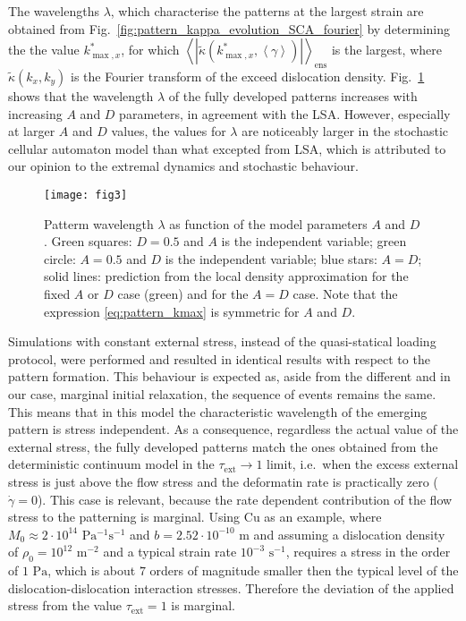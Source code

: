 The wavelengths $\lambda$, which characterise the patterns at the largest strain are obtained from Fig.~\ref{fig:pattern_kappa_evolution_SCA_fourier} by determining the the value ${k_{\max ,x}^ * }$, for which ${\left\langle {\left| {\tilde \kappa \left( {k_{\max ,x}^ * ,\left\langle \gamma  \right\rangle } \right)} \right|} \right\rangle _{{\text{ens}}}}$ is the largest, where $\tilde \kappa \left( {{k_x},{k_y}} \right)$ is the Fourier transform of the exceed dislocation density.
Fig.~\ref{fig:pattern_wavelength_plot} shows that the wavelength $\lambda$ of the fully developed patterns increases with increasing $A$ and $D$ parameters, in agreement with the LSA. However, especially at larger $A$ and $D$ values, the values for $\lambda$ are noticeably larger in the stochastic cellular automaton model than what excepted from LSA, which is attributed to our opinion to the extremal dynamics and stochastic behaviour.

\begin{figure}[htbp!] 
\centering    
\texttt{[image: fig3]}
\caption[Pattern wavelengths comparison]{Patterm wavelength $\lambda$ as function of the model parameters $A$ and $D$. Green squares: $D=0.5$ and $A$ is the independent variable; green circle: $A=0.5$ and $D$ is the independent variable; blue stars: $A=D$; solid lines: prediction from the local density approximation for the fixed $A$ or $D$ case (green) and for the $A=D$ case. Note that the expression \cref{eq:pattern_kmax} is symmetric for $A$ and $D$.}
\label{fig:pattern_wavelength_plot}
\end{figure}


Simulations with constant external stress, instead of the quasi-statical loading protocol, were performed and resulted in identical results with respect to the pattern formation. This behaviour is expected as, aside from the different and in our case, marginal initial relaxation, the sequence of events remains the same. This means that in this model the characteristic wavelength of the emerging pattern is stress independent. As a consequence, regardless the actual value of the external stress, the fully developed patterns match the ones obtained from the deterministic continuum model in the ${\tau _{{\text{ext}}}} \to 1$ limit, i.e.\ when the excess external stress is just above the flow stress and the deformatin rate is practically zero ($\dot \gamma  = 0$). This case is relevant, because the rate dependent contribution of the flow stress to the patterning is marginal. Using Cu as an example, where ${M_0} \approx 2 \cdot {10^{14}}{\text{ P}}{{\text{a}}^{ - 1}}{{\text{s}}^{ - 1}}$ \cite{kubin1992modelling} and $b = 2.52 \cdot {10^{ - 10}}{\text{ m}}$ and assuming a dislocation density of ${\rho _0} = {10^{12}}{{\text{ m}}^{ - 2}}$ and a typical strain rate ${10^{ - 3}}{{\text{ s}}^{ - 1}}$, requires a stress in the order of $1{\text{ Pa}}$, which is about $7$ orders of magnitude smaller then the typical level of the dislocation-dislocation interaction stresses. Therefore the deviation of the applied stress from the value ${\tau _{{\text{ext}}}} = 1$ is marginal.


